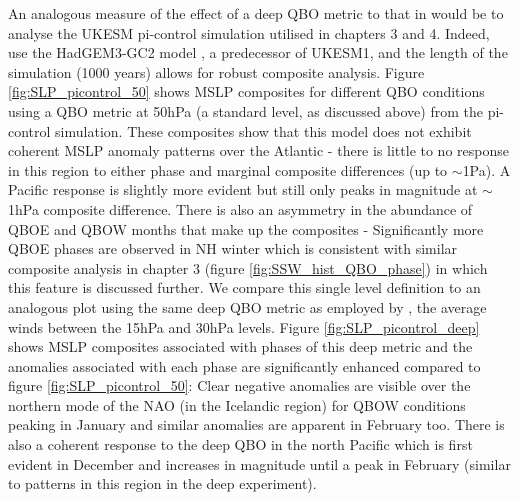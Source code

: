 An analogous measure of the effect of a deep QBO metric to that in \cite{andrewsObserved2019d} would be to analyse the UKESM pi-control simulation utilised in chapters 3 and 4. Indeed, \cite{andrewsObserved2019d} use the HadGEM3-GC2 model \citep{williamsMet2018b}, a predecessor of UKESM1, and the length of the simulation (1000 years) allows for robust composite analysis. Figure \ref{fig:SLP_picontrol_50} shows MSLP composites for different QBO conditions using a QBO metric at 50hPa (a standard level, as discussed above) from the pi-control simulation. These composites show that this model does not exhibit coherent MSLP anomaly patterns over the Atlantic - there is little to no response in this region to either phase and marginal composite differences (up to $\sim$1Pa). A Pacific response is slightly more evident but still only peaks in magnitude at $\sim$1hPa composite difference. There is also an asymmetry in the abundance of QBOE and QBOW months that make up the composites - Significantly more QBOE phases are observed in NH winter which is consistent with similar composite analysis in chapter 3 (figure \ref{fig:SSW_hist_QBO_phase}) in which this feature is discussed further. We compare this single level definition to an analogous plot using the same deep QBO metric as employed by \cite{andrewsObserved2019d}, the average winds between the 15hPa and 30hPa levels. Figure \ref{fig:SLP_picontrol_deep} shows MSLP composites associated with phases of this deep metric and the anomalies associated with each phase are significantly enhanced compared to figure \ref{fig:SLP_picontrol_50}: Clear negative anomalies are visible over the northern mode of the NAO (in the Icelandic region) for QBOW conditions peaking in January and similar anomalies are apparent in February too. There is also a coherent response to the deep QBO in the north Pacific which is first evident in December and increases in magnitude until a peak in February (similar to patterns in this region in the deep experiment).

